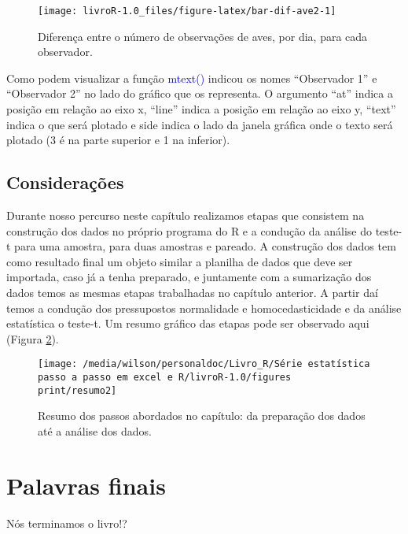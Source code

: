 \documentclass[14pt,titlepage, oneside, openany, a4paper]{book}
\begin{document}
\begin{figure}[H]
\texttt{[image: livroR-1.0\_files/figure-latex/bar-dif-ave2-1]} \caption{Diferença entre o número de observações de aves, por dia, para cada observador.}\label{fig:bar-dif-ave2}
\end{figure}

Como podem visualizar a função \textcolor{blue}{mtext()} indicou os nomes ``Observador 1'' e ``Observador 2'' no lado do gráfico que os representa. O argumento ``at'' indica a posição em relação ao eixo x, ``line'' indica a posição em relação ao eixo y, ``text'' indica o que será plotado e side indica o lado da janela gráfica onde o texto será plotado (3 é na parte superior e 1 na inferior).

\hypertarget{considerauxe7uxf5es-2}{%
\section{Considerações}\label{considerauxe7uxf5es-2}}

Durante nosso percurso neste capítulo realizamos etapas que consistem na construção dos dados no próprio programa do R e a condução da análise do teste-t para uma amostra, para duas amostras e pareado. A construção dos dados tem como resultado final um objeto similar a planilha de dados que deve ser importada, caso já a tenha preparado, e juntamente com a sumarização dos dados temos as mesmas etapas trabalhadas no capítulo anterior. A partir daí temos a condução dos pressupostos normalidade e homocedasticidade e da análise estatística o teste-t. Um resumo gráfico das etapas pode ser observado aqui (Figura \ref{fig:resumo3}).

\begin{figure}[H]
\texttt{[image: /media/wilson/personaldoc/Livro\_R/Série estatística passo a passo em excel e R/livroR-1.0/figures print/resumo2]} \caption{Resumo dos passos abordados no capítulo: da preparação dos dados até a análise dos dados.}\label{fig:resumo3}
\end{figure}

\hypertarget{palavras-finais}{%
\chapter{Palavras finais}\label{palavras-finais}}

Nós terminamos o livro!?


\end{document}
